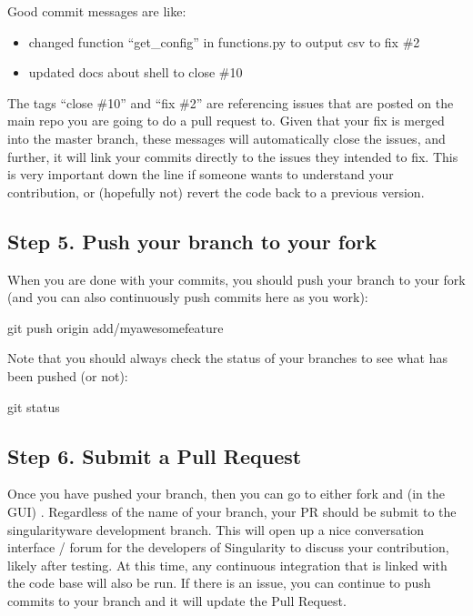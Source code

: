 \documentclass[letterpaper,10pt,english]{sphinxmanual}
\begin{document}
Good commit messages are like:
\begin{itemize}
\item {} 
changed function “get\_config” in functions.py to output csv to fix \#2

\item {} 
updated docs about shell to close \#10

\end{itemize}

The tags “close \#10” and “fix \#2” are referencing issues that are posted on the main repo you are going to do a pull request to. Given that your fix is merged into the master branch, these messages will automatically close the issues, and further, it will link your commits directly to the issues they intended to fix. This is very important down the line if someone wants to understand your contribution, or (hopefully not) revert the code back to a previous version.


\subsection{Step 5. Push your branch to your fork}
\label{\detokenize{contributing:step-5-push-your-branch-to-your-fork}}
When you are done with your commits, you should push your branch to your fork (and you can also continuously push commits here as you work):

%
\begin{sphinxVerbatim}[commandchars=\\\{\}]
git push origin add/my\PYGZhy{}awesome\PYGZhy{}feature
\end{sphinxVerbatim}

Note that you should always check the status of your branches to see what has been pushed (or not):

%
\begin{sphinxVerbatim}[commandchars=\\\{\}]
git status
\end{sphinxVerbatim}


\subsection{Step 6. Submit a Pull Request}
\label{\detokenize{contributing:step-6-submit-a-pull-request}}
Once you have pushed your branch, then you can go to either fork and (in the GUI) . Regardless of the name of your branch, your PR should be submit to the singularityware development branch. This will open up a nice conversation interface / forum for the developers of Singularity to discuss your contribution, likely after testing. At this time, any continuous integration that is linked with the code base will also be run. If there is an issue, you can continue to push commits to your branch and it will update the Pull Request.
\end{document}
